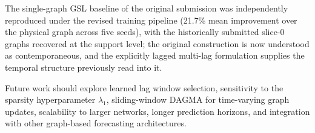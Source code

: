 The single-graph GSL baseline of the original submission was independently reproduced under the revised training pipeline (21.7\% mean improvement over the physical graph across five seeds), with the historically submitted slice-0 graphs recovered at the support level; the original construction is now understood as contemporaneous, and the explicitly lagged multi-lag formulation supplies the temporal structure previously read into it.

Future work should explore learned lag window selection, sensitivity to the sparsity hyperparameter $\lambda_1$, sliding-window DAGMA for time-varying graph updates, scalability to larger networks, longer prediction horizons, and integration with other graph-based forecasting architectures.
